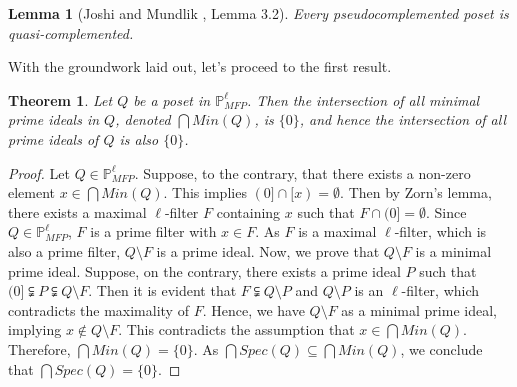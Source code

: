 \documentclass[10pt,one side,emlines]{amsart}
\newtheorem{lemma}[lem]{Lemma}
\newtheorem{thm}[lem]{Theorem}
\theoremstyle{definition}
\begin{document}
\begin{lemma}[Joshi and Mundlik \cite{VM}, Lemma 3.2]\label{3.8}
	Every pseudocomplemented poset is quasi-complemented.
\end{lemma}

With the groundwork laid out, let's proceed to the first result.

\begin{thm}\label{1.6} 
	Let $Q$ be a poset in $\mathbb{P}^{\ell}_{MFP}$. Then the intersection of all minimal prime ideals in $Q$, denoted $\bigcap Min(Q)$, is $\{0\}$, and hence the intersection of all prime ideals of $Q$ is also $\{0\}$.
\end{thm}
\begin{proof} 
	Let $Q \in \mathbb{P}^{\ell}_{MFP}$. Suppose, to the contrary, that there exists a non-zero element $x \in \bigcap Min(Q)$. This implies $(0] \cap [x)= \emptyset $. Then by Zorn's lemma, there exists a maximal $\ell$-filter $F$ containing $x$ such that $F \cap (0]=\emptyset $. Since $Q\in \mathbb{P}^{\ell}_{MFP}$, $F$ is a prime filter with $x \in F$. As $F$ is a maximal $\ell$-filter, which is also a prime filter, $Q\setminus F$ is a prime ideal. Now, we prove that $Q \setminus F$ is a minimal prime ideal. Suppose, on the contrary, there exists a prime ideal $P$ such that $(0] \subsetneqq P \subsetneqq Q \setminus F$. Then it is evident that $F \subsetneqq Q \setminus P$ and $Q \setminus P$ is an $\ell$-filter, which contradicts the maximality of $F$. Hence, we have $Q \setminus F$ as a minimal prime ideal, implying $x \notin Q \setminus F$. This contradicts the assumption that $x \in \bigcap Min(Q)$. Therefore, $\bigcap Min(Q)=\{0\}$. As $\bigcap Spec(Q)\subseteq \bigcap Min(Q)$, we conclude that $\bigcap Spec(Q)=\{0\}$.
\end{proof}
\end{document}
